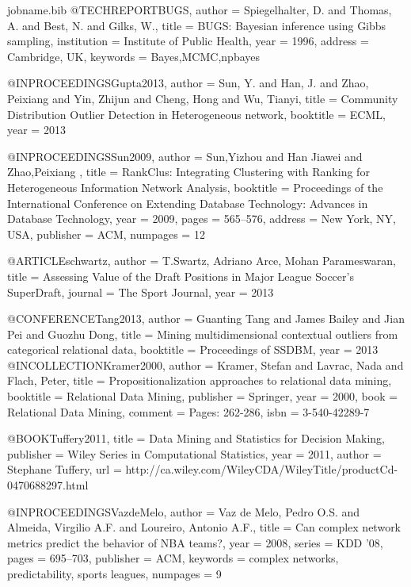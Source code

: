 {\begin{filecontents*}{jobname.bib}
	@TECHREPORT{BUGS,
		author = {Spiegelhalter, D. and Thomas, A. and Best, N. and Gilks, W.},
		title = {BUGS: Bayesian inference using Gibbs sampling},
		institution = {Institute of Public Health},
		year = {1996},
		address = { Cambridge, UK},
		keywords = {Bayes,MCMC,npbayes}
	}
	
	@INPROCEEDINGS{Gupta2013,
		author = {Sun, Y. and Han, J. and Zhao, Peixiang and Yin, Zhijun and Cheng,
			Hong and Wu, Tianyi},
		title = {Community Distribution Outlier Detection in Heterogeneous network},
		booktitle = {ECML},
		year = {2013}
	}
	
	@INPROCEEDINGS{Sun2009,
		author = {Sun,Yizhou and Han Jiawei and Zhao,Peixiang },
		title = {RankClus: Integrating Clustering with Ranking for Heterogeneous Information
			Network Analysis},
		booktitle = {Proceedings of the International Conference on Extending Database
			Technology: Advances in Database Technology},
		year = {2009},
		pages = {565--576},
		address = {New York, NY, USA},
		publisher = {ACM},
		numpages = {12}
	}
	
	@ARTICLE{schwartz,
		author = {T.Swartz, Adriano Arce, Mohan Parameswaran},
		title = {Assessing Value of the Draft Positions in Major League Soccer's SuperDraft},
		journal = {The Sport Journal},
		year = {2013}
	}
	
	@CONFERENCE{Tang2013,
		author = {Guanting Tang and James Bailey and Jian Pei and Guozhu Dong},
		title = {Mining multidimensional contextual outliers from categorical relational
			data},
		booktitle = {Proceedings of SSDBM},
		year = {2013}
	}
	@INCOLLECTION{Kramer2000,
		author = {Kramer, Stefan and Lavrac, Nada and Flach, Peter},
		title = {Propositionalization approaches to relational data mining},
		booktitle = {Relational Data Mining},
		publisher = {Springer},
		year = {2000},
		book = {Relational Data Mining},
		comment = {Pages: 262-286},
		isbn = {3-540-42289-7}
	}
	
	@BOOK{Tuffery2011,
		title = {Data Mining and Statistics for Decision Making},
		publisher = {Wiley Series in Computational Statistics},
		year = {2011},
		author = {Stephane Tuffery},
		url = {http://ca.wiley.com/WileyCDA/WileyTitle/productCd-0470688297.html}
	}
	
	@INPROCEEDINGS{VazdeMelo,
		author = {Vaz de Melo, Pedro O.S. and Almeida, Virgilio A.F. and Loureiro,
			Antonio A.F.},
		title = {Can complex network metrics predict the behavior of NBA teams?},
		year = {2008},
		series = {KDD '08},
		pages = {695--703},
		publisher = {ACM},
		keywords = {complex networks, predictability, sports leagues},
		numpages = {9}
	}
	

\end{filecontents*}}
